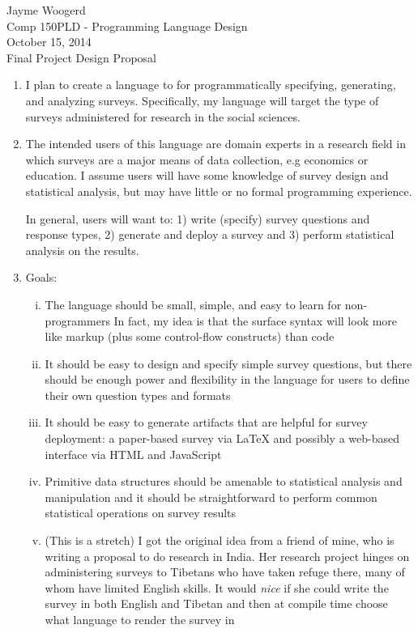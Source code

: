 \documentclass[12pt]{article}
\begin{document}
Jayme Woogerd \\
\indent Comp 150PLD - Programming Language Design \\
\indent October 15, 2014 \\
\indent Final Project Design Proposal \\
        
\begin{enumerate}[1)]
\item I plan to create a language to for programmatically specifying, generating, 
and analyzing surveys. Specifically, my language will target the type of surveys 
administered for research in the social sciences.

\item The intended users of this language are domain experts in a research
field in which surveys are a major means of data collection, e.g economics or 
education. I assume users will have some knowledge of survey design and 
statistical analysis, but may have little or no formal programming experience.

In general, users will want to: 1) write (specify) survey questions and 
response types, 2) generate and deploy a survey and 3) perform statistical 
analysis on the results.

\item Goals:

\begin{enumerate}[i)]
\item The language should be small, simple, and easy to learn for non-programmers
In fact, my idea is that the surface syntax will look more like markup (plus some
control-flow constructs) than code
\item It should be easy to design and specify simple survey questions, but there
should be enough power and flexibility in the language for users to define 
their own question types and formats
\item It should be easy to generate artifacts that are helpful for 
survey deployment: a paper-based survey via LaTeX and possibly a web-based 
interface via HTML and JavaScript
\item Primitive data structures should be amenable to statistical analysis and
manipulation and it should be straightforward to perform common statistical 
operations on survey results
\item (This is a stretch) I got the original idea from a friend of mine, who is
writing a proposal to do research in India. Her research project hinges on administering 
surveys to Tibetans who have taken refuge there, many of whom have limited English
skills. It would \textit{nice} if she could write the survey in both English 
and Tibetan and then at compile time choose what language to render the survey in
\end{enumerate}


\end{enumerate}
\end{document}
